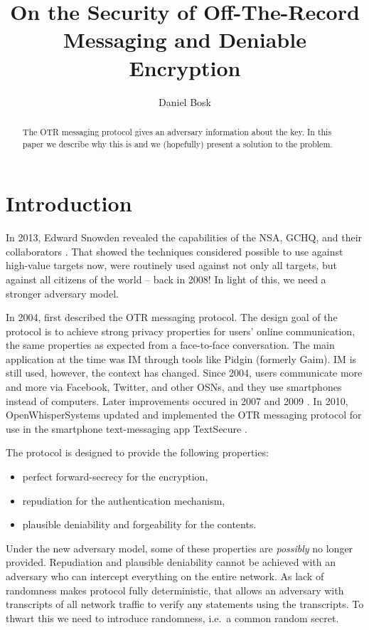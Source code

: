 \title{%
  On the Security of Off-The-Record Messaging
  and Deniable Encryption
}
\author{%
  Daniel Bosk
}

\maketitle
\begin{abstract}
  The \ac{OTR} messaging protocol gives an adversary information about the key.
  In this paper we describe why this is and we (hopefully) present a solution 
  to the problem.
\end{abstract}


\acresetall
\section{Introduction}

In 2013, Edward Snowden \cite{landau2013making} revealed the capabilities of 
the NSA, GCHQ, and their collaborators \cite[e.g.][]{nsa1,nsa2}.
That showed the techniques considered possible to use against high-value 
targets now, were routinely used against not only all targets, but against all 
citizens of the world -- back in 2008!
In light of this, we need a stronger adversary model.

In 2004, \citeauthor{otr2004} \cite{otr2004} first described the \ac{OTR} 
messaging protocol.
The design goal of the protocol is to achieve strong privacy properties for 
users' online communication, the same properties as expected from 
a face-to-face conversation.
The main application at the time was \ac{IM} through tools like Pidgin 
\cite{pidgin} (formerly Gaim).
\ac{IM} is still used, however, the context has changed.
Since 2004, users communicate more and more via Facebook, Twitter, and other 
\acp{OSN}, and they use smartphones instead of computers.
Later improvements occured in 2007 \cite{otr2007} and 2009 \cite{multiotr2009}.
In 2010, OpenWhisperSystems updated and implemented the \ac{OTR} messaging 
protocol for use in the smartphone text-messaging app TextSecure 
\cite{textsecure}.

The protocol is designed to provide the following properties:
\begin{itemize}
  \item perfect forward-secrecy for the encryption,
  \item repudiation for the authentication mechanism,
  \item plausible deniability and forgeability for the contents.
\end{itemize}
Under the new adversary model, some of these properties are \emph{possibly} 
no longer provided.
Repudiation and plausible deniability cannot be achieved with an adversary 
who can intercept everything on the entire network.
As lack of randomness makes protocol fully deterministic, that allows an 
adversary with transcripts of all network traffic to verify any statements 
using the transcripts.
To thwart this we need to introduce randomness, i.e.~a common random secret.

